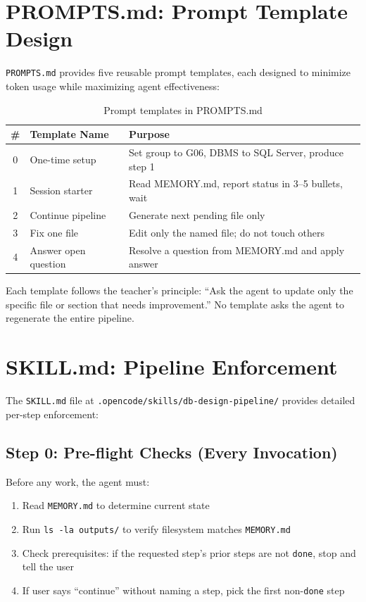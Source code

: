 \documentclass[12pt,a4paper]{article}
\begin{document}
\section{PROMPTS.md: Prompt Template Design}

\texttt{PROMPTS.md} provides five reusable prompt templates, each designed to minimize token usage while maximizing agent effectiveness:

\begin{table}[h]
\centering
\begin{tabular}{|c|p{3cm}|p{6cm}|}
\hline
\textbf{\#} & \textbf{Template Name} & \textbf{Purpose} \\
\hline
0 & One-time setup & Set group to G06, DBMS to SQL Server, produce step 1 \\
\hline
1 & Session starter & Read MEMORY.md, report status in 3--5 bullets, wait \\
\hline
2 & Continue pipeline & Generate next pending file only \\
\hline
3 & Fix one file & Edit only the named file; do not touch others \\
\hline
4 & Answer open question & Resolve a question from MEMORY.md and apply answer \\
\hline
\end{tabular}
\caption{Prompt templates in PROMPTS.md}
\end{table}

Each template follows the teacher's principle: ``Ask the agent to update only the specific file or section that needs improvement.'' No template asks the agent to regenerate the entire pipeline.

\section{SKILL.md: Pipeline Enforcement}

The \texttt{SKILL.md} file at \texttt{.opencode/skills/db-design-pipeline/} provides detailed per-step enforcement:

\subsection{Step 0: Pre-flight Checks (Every Invocation)}

Before any work, the agent must:
\begin{enumerate}
    \item Read \texttt{MEMORY.md} to determine current state
    \item Run \texttt{ls -la outputs/} to verify filesystem matches \texttt{MEMORY.md}
    \item Check prerequisites: if the requested step's prior steps are not \texttt{done}, stop and tell the user
    \item If user says ``continue'' without naming a step, pick the first non-\texttt{done} step
\end{enumerate}
\end{document}
